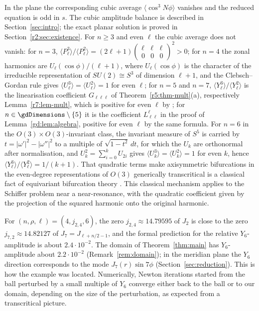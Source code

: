 \documentclass[11pt]{amsart}
\theoremstyle{definition}
\theoremstyle{remark}
\numberwithin{equation}{section}
\begin{document}
In the plane the corresponding cubic average $\langle\cos^3N\phi\rangle$ vanishes and the reduced equation is odd in $s$. The cubic amplitude balance is described in Section~\ref{sec:intro}; the exact planar solution is proved in Section~\ref{r2:sec:existence}. For $n\geq3$ and even $\ell$ the cubic average does not vanish: for $n=3$, $\langle P_\ell^3\rangle/\langle P_\ell^2\rangle=(2\ell+1)\left(\begin{smallmatrix}\ell&\ell&\ell\\0&0&0\end{smallmatrix}\right)^2>0$; for $n=4$ the zonal harmonics are $U_\ell(\cos\phi)/(\ell+1)$, where $U_\ell(\cos\phi)$ is the character of the irreducible representation of $SU(2)\cong S^3$ of dimension $\ell+1$, and the Clebsch--Gordan rule gives $\langle U_\ell^3\rangle=\langle U_\ell^2\rangle=1$ for even $\ell$; for $n=5$ and $n=7$, $\langle Y_\ell^3\rangle/\langle Y_\ell^2\rangle$ is the linearisation coefficient $G_{\ell\ell\ell}$ of Theorem~\ref{r5:thm-mult}(a), respectively Lemma~\ref{r7:lem-mult}, which is positive for even $\ell$ by \cite[18.18.22]{DLMF}; for $n\in\gdDimensions\setminus\{5\}$ it is the coefficient $L_{\ell\ell}^{\ell}$ in the proof of Lemma~\ref{gd:lem:algebra}, positive for even $\ell$ by the same formula. For $n=6$ in the $O(3)\times O(3)$-invariant class, the invariant measure of $S^5$ is carried by $t=|\omega'|^2-|\omega''|^2$ to a multiple of $\sqrt{1-t^2}\,dt$, for which the $U_k$ are orthonormal after normalisation, and $U_k^2=\sum_{i=0}^kU_{2i}$ gives $\langle U_k^3\rangle=\langle U_k^2\rangle=1$ for even $k$, hence $\langle Y_\ell^3\rangle/\langle Y_\ell^2\rangle=1/(k+1)$. That quadratic terms make axisymmetric bifurcations in the even-degree representations of $O(3)$ generically transcritical is a classical fact of equivariant bifurcation theory \cite{IG84,GSS88}. This classical mechanism applies to the Schiffer problem near a near-resonance, with the quadratic coefficient given by the projection of the squared harmonic onto the original harmonic.

For $(n,\rho,\ell)=(4,j_{2,4},6)$, the zero $j_{2,4}\approx14.79595$ of $J_2$ is close to the zero $j_{7,2}\approx14.82127$ of $J_7=J_{\ell+n/2-1}$, and the formal prediction for the relative $Y_6$-amplitude is about $2.4\cdot10^{-2}$. The domain of Theorem~\ref{thm:main} has $Y_6$-amplitude about $2.2\cdot10^{-2}$ (Remark~\ref{rem:domain}); in the meridian plane the $Y_6$ direction corresponds to the mode $J_7(r)\sin7\phi$ (Section~\ref{sec:reduction}). This is how the example was located. Numerically, Newton iterations started from the ball perturbed by a small multiple of $Y_6$ converge either back to the ball or to our domain, depending on the size of the perturbation, as expected from a transcritical picture.
\end{document}
